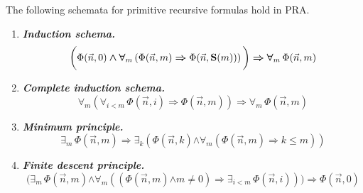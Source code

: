 \documentclass[10pt]{amsart}
\newcommand{\mforall}{\boldsymbol{\forall}}
\newcommand{\mexists}{\boldsymbol{\exists}}
\newcommand{\mra}{\boldsymbol{\Rightarrow}}
\newcommand{\mand}{\boldsymbol{\wedge}}
\newcommand{\mle}{\boldsymbol{<}}
\newcommand{\mleq}{\boldsymbol{\leq}}
\newcommand{\mneq}{\boldsymbol{\neq}}
\begin{document}
\begin{theorem}\label{theorem:statements_equivalent_to_induction_axiom_schema_for_primitive_recursive_formulas}
	The following schemata for primitive recursive formulas hold in $\mathrm{PRA}$.
	\begin{enumerate}[label=\emph{\textbf{(\roman*)}}]
		\item \emph{\textbf{Induction schema.}}
		      $$\bigg(\Phi(\vec{n},0) \mand \mforall_m\left(\Phi(\vec{n},m) \mra \Phi(\vec{n},\bd{S}(m))\right)\bigg) \mra \mforall_m\,\Phi(\vec{n},m)$$
		\item \emph{\textbf{Complete induction schema.}}
		      $$\mforall_m\left(\mforall_{i \mle m}\,\Phi(\vec{n},i) \mra \Phi(\vec{n},m)\right) \mra \mforall_m\,\Phi(\vec{n},m)$$
		\item \emph{\textbf{Minimum principle.}}
		      $$\mexists_m\,\Phi(\vec{n},m) \mra \mexists_k\left(\Phi(\vec{n},k) \mand \mforall_m\left(\Phi(\vec{n},m) \mra k \mleq m\right)\right)$$
		\item \emph{\textbf{Finite descent principle.}}
		      $$\bigg(\mexists_m\,\Phi(\vec{n},m) \mand \mforall_{m}\left((\Phi(\vec{n},m) \mand m \mneq 0) \mra \mexists_{i \mle m}\,\Phi(\vec{n},i)\right)\bigg) \mra \Phi(\vec{n},0)$$
	\end{enumerate}
\end{theorem}
\end{document}
